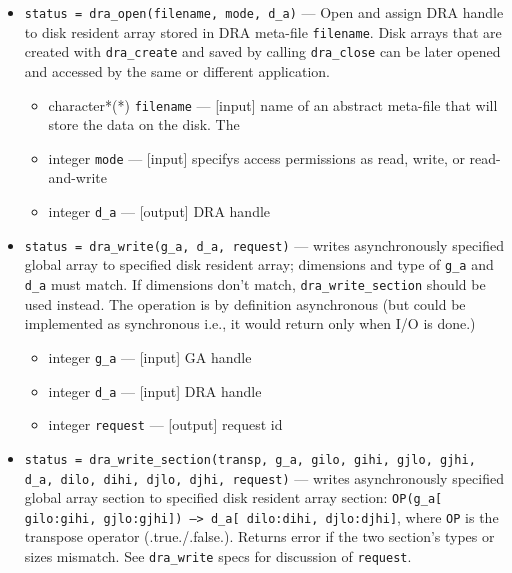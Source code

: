 \begin{itemize}
\item {\tt status = dra\_open(filename, mode, d\_a)} ---
	      Open and assign DRA handle to disk resident array stored in DRA
	      meta-file {\tt filename}.  Disk arrays that are created
	      with {\tt dra\_create} and saved by calling {\tt dra\_close} can be
	      later opened and accessed by the same or different
	      application.

\begin{itemize}
\item              character*(*) {\tt filename} --- [input]
      name of an abstract
      meta-file that will store the data on the disk. The
\item              integer {\tt mode} --- [input] specifys access permissions
as read, write, or read-and-write
\item              integer {\tt d\_a} --- [output]   DRA handle
\end{itemize}

\item {\tt status = dra\_write(g\_a, d\_a, request)} ---
              writes asynchronously specified global array to specified 
              disk resident array;
              dimensions and type of {\tt g\_a} and {\tt d\_a} must match. If dimensions
              don't match, {\tt dra\_write\_section} should be used instead.   
      The operation is by definition asynchronous (but could   
      be implemented as synchronous i.e., it would return only
      when I/O is done.)

\begin{itemize}
\item              integer {\tt g\_a} --- [input]   GA handle
\item              integer {\tt d\_a} --- [input]   DRA handle
\item              integer {\tt request} --- [output]  request id
\end{itemize}

\item {\tt status = dra\_write\_section(transp, g\_a, gilo, gihi, gjlo, gjhi, 
                                        d\_a, dilo, dihi, djlo, djhi, request)} ---
              writes asynchronously specified global array section to 
              specified disk resident array section:
                {\tt OP(g\_a[ gilo:gihi, gjlo:gjhi]) --> d\_a[ dilo:dihi, djlo:djhi]},
              where {\tt OP} is the transpose operator (.true./.false.).
              Returns error if the two section's types or sizes mismatch.
              See {\tt dra\_write} specs for discussion of {\tt request}. 


\end{itemize}

